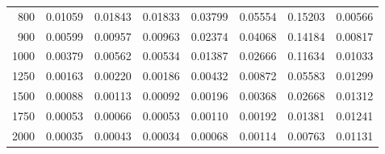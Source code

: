 \begin{table}[ht]
\begin{tabular}{r|c|c|c|c|c|c|c}
      800 & 0.01059 & 0.01843 & 0.01833 & 0.03799 & 0.05554 & 0.15203 & 0.00566 \\
      900 & 0.00599 & 0.00957 & 0.00963 & 0.02374 & 0.04068 & 0.14184 & 0.00817 \\
     1000 & 0.00379 & 0.00562 & 0.00534 & 0.01387 & 0.02666 & 0.11634 & 0.01033 \\
     1250 & 0.00163 & 0.00220 & 0.00186 & 0.00432 & 0.00872 & 0.05583 & 0.01299 \\
     1500 & 0.00088 & 0.00113 & 0.00092 & 0.00196 & 0.00368 & 0.02668 & 0.01312 \\
     1750 & 0.00053 & 0.00066 & 0.00053 & 0.00110 & 0.00192 & 0.01381 & 0.01241 \\
     2000 & 0.00035 & 0.00043 & 0.00034 & 0.00068 & 0.00114 & 0.00763 & 0.01131 \\ \cline{1-8}
    \end{tabular}
    \label{tab:XRayEffOCX2}
\end{table}

